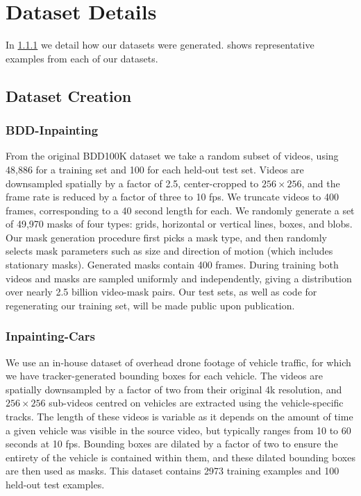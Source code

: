 \chapter{Dataset Details}
\label{app:datasetss}
In \cref{sec:datasetcreation} we detail how our datasets were generated.  shows representative examples from each of our datasets.
\section{Dataset Creation}
\subsection{BDD-Inpainting}
\label{sec:datasetcreation}
From the original BDD100K dataset we take a random subset of videos, using 48,886 for a training set and 100 for each held-out test set. Videos are downsampled spatially by a factor of 2.5, center-cropped to $256 \times 256$, and the frame rate is reduced by a factor of three to 10 fps.  We truncate videos to 400 frames, corresponding to a 40 second length for each. We randomly generate a set of 49,970 masks of four types: grids, horizontal or vertical lines, boxes, and blobs. Our mask generation procedure first picks a mask type, and then randomly selects mask parameters such as size and direction of motion (which includes stationary masks). Generated masks contain 400 frames. During training both videos and masks are sampled uniformly and independently, giving a distribution over nearly 2.5 billion video-mask pairs. Our test sets, as well as code for regenerating our training set, will be made public upon publication.

\subsection{Inpainting-Cars}
 We use an in-house dataset of overhead drone footage of vehicle traffic, for which we have tracker-generated bounding boxes for each vehicle. The videos are spatially downsampled by a factor of two from their original 4k resolution, and  $256 \times 256$ sub-videos centred on vehicles are extracted using the vehicle-specific tracks. The length of these videos is variable as it depends on the amount of time a given vehicle was visible in the source video, but typically ranges from 10 to 60 seconds at 10 fps. Bounding boxes are dilated by a factor of two to ensure the entirety of the vehicle is contained within them, and these dilated bounding boxes are then used as masks. This dataset contains 2973 training examples and 100 held-out test examples. 

